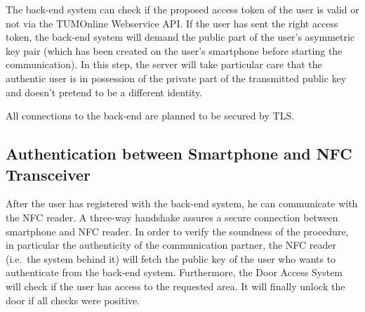 
The back-end system can check if the proposed access token of the user is valid or not via the TUMOnline Webservice API.
If the user has sent the right access token, the back-end system will demand the public part of the user's asymmetric key pair (which has been created on the user's smartphone before starting the communication).
In this step, the server will take particular care that the authentic user is in possession of the private part of the transmitted public key and doesn't pretend to be a different identity.


All connections to the back-end are planned to be secured by TLS.


\subsection{Authentication between Smartphone and NFC Transceiver}
After the user has registered with the back-end system, he can communicate with the NFC reader. 
A three-way handshake assures a secure connection between smartphone and NFC reader.
In order to verify the soundness of the procedure, in particular the authenticity of the communication partner, the NFC reader (i.e.~the system behind it) will fetch the public key of the user who wants to authenticate from the back-end system.
Furthermore, the Door Access System will check if the user has access to the requested area.
It will finally unlock the door if all checks were positive.
